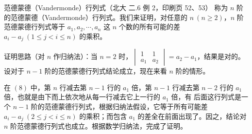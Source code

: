\begin{fdeep}{范德蒙德（Vandermonde）行列式（北大 二.6 例 2，印刷页 52、53）}
称为 $n$ 阶的范德蒙德（Vandermonde）行列式。我们来证明，对任意的 $n\ (n\ge 2)$，$n$ 阶范德蒙德行列式等于 $a_1,a_2,\cdots,a_n$ 这 $n$ 个数的所有可能的差 $a_i-a_j\ (1\le j<i\le n)$ 的乘积。

证明思路（对 $n$ 作归纳法）：当 $n=2$ 时，$\begin{vmatrix}1&1\\a_1&a_2\end{vmatrix}=a_2-a_1$，结果是对的。设对于 $n-1$ 阶的范德蒙德行列式结论成立，现在来看 $n$ 阶的情形。

在 $(8)$ 中，第 $n$ 行减去第 $n-1$ 行的 $a_1$ 倍，第 $n-1$ 行减去第 $n-2$ 行的 $a_1$ 倍，也就是由下而上依次地从每一行减去它上一行的 $a_1$ 倍，有
后面这行列式是一个 $n-1$ 阶的范德蒙德行列式，根据归纳法假设，它等于所有可能差 $a_i-a_j\ (2\le j<i\le n)$ 的乘积；而包含 $a_1$ 的差全在前面出现了。因之，结论对 $n$ 阶范德蒙德行列式也成立。根据数学归纳法，完成了证明。


\end{fdeep}
